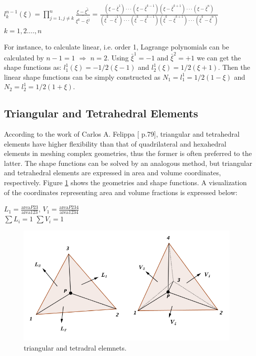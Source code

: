 \begin{center}
	$l_k^{n-1} \left( \xi \right) = \prod_{j = 1, j \neq k}^{n} \frac{\xi - \bar{\xi^1}}{\bar{\xi^k - \bar{\xi^j}}} = \frac{\left(\xi - \bar{\xi}^1\right)\cdot\cdot\cdot \left( \xi - \bar{\xi}^{k-1}\right) \left(\xi - \bar{\xi}^{k+1}\right)\cdot\cdot\cdot \left(\xi -\bar{\xi}^n\right)}{\left(\bar{\xi}^k - \bar{\xi}^1\right)\cdot\cdot\cdot \left( \bar{\xi}^k - \bar{\xi}^{k-1}\right) \left(\bar{\xi}^k - \bar{\xi}^{k+1}\right)\cdot\cdot\cdot \left(\bar{\xi}^k -\bar{\xi}^n\right)}$ \\[4mm] \quad $k = 1,2....,n$
\end{center}
For instance, to calculate linear, i.e. order 1, Lagrange polynomials can be calculated by $n-1=1$ $\Rightarrow$ $n=2$. Using $\bar{\xi}^1 = -1$ and $\bar{\xi}^2 = +1$ we can get the shape functions as: $l_1^1\left(\xi\right) = -1/2\left(\xi - 1\right)$ and $l_2^1\left(\xi\right) = 1/2\left(\xi + 1\right)$.
Then the linear shape functions can be simply constructed as $N_1 =l_1^1 = 1/2\left(1-\xi\right)$ and $N_2 = l_2^1 = 1/2\left(1+\xi\right)$.

\subsection{Triangular and Tetrahedral Elements}
According to the work of Carlos A. Felippa [\cite{Felippa} p.79], triangular and tetrahedral elements have higher flexibility than that of quadrilateral and hexahedral elements in meshing complex geometries, thus the former is often preferred to the latter. The shape functions can be solved by an analogous method, but triangular and tetrahedral elements are expressed in area and volume coordinates, respectively. Figure \ref{fig: tri&tet} shows the geometries and shape functions. A visualization of the coordinates representing area and volume fractions is expressed below:
\begin{center}
	$L_1 = \frac{\text{area}P23}{\text{area}123}$, \quad $V_1 = \frac{\text{area}P234}{\text{area}1234}$ \\[4mm]
	$\sum L_i = 1$ \quad\quad $\sum V_i = 1$
\end{center}
\clearpage
\begin{figure}
	\begin{center}
		\includegraphics[width=11cm,clip]{Tri&Tet.pdf}			
		\caption{triangular and tetradral elemnets.} \label{fig: tri&tet}
	\end{center}
\end{figure}


